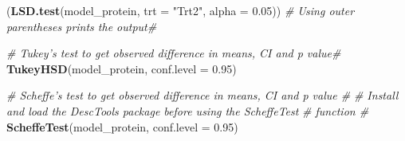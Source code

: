 \documentclass[]{article}
\newenvironment{Shaded}{\begin{snugshade}}{\end{snugshade}}
\newcommand{\CommentTok}[1]{\textcolor[rgb]{0.56,0.35,0.01}{\textit{#1}}}
\newcommand{\DataTypeTok}[1]{\textcolor[rgb]{0.13,0.29,0.53}{#1}}
\newcommand{\FloatTok}[1]{\textcolor[rgb]{0.00,0.00,0.81}{#1}}
\newcommand{\KeywordTok}[1]{\textcolor[rgb]{0.13,0.29,0.53}{\textbf{#1}}}
\newcommand{\NormalTok}[1]{#1}
\newcommand{\StringTok}[1]{\textcolor[rgb]{0.31,0.60,0.02}{#1}}
\begin{document}
\begin{Shaded}
\begin{Highlighting}[]
\NormalTok{(}\KeywordTok{LSD.test}\NormalTok{(model_protein, }\DataTypeTok{trt =} \StringTok{"Trt2"}\NormalTok{, }\DataTypeTok{alpha =} \FloatTok{0.05}\NormalTok{))  }\CommentTok{# Using outer parentheses prints the output#}

\CommentTok{# Tukey's test to get observed difference in means, CI and p value#}
\KeywordTok{TukeyHSD}\NormalTok{(model_protein, }\DataTypeTok{conf.level =} \FloatTok{0.95}\NormalTok{)}

\CommentTok{# Scheffe's test to get observed difference in means, CI and p value #}
\CommentTok{# Install and load the DescTools package before using the ScheffeTest}
\CommentTok{# function #}
\KeywordTok{ScheffeTest}\NormalTok{(model_protein, }\DataTypeTok{conf.level =} \FloatTok{0.95}\NormalTok{)}
\end{Highlighting}
\end{Shaded}
\end{document}
